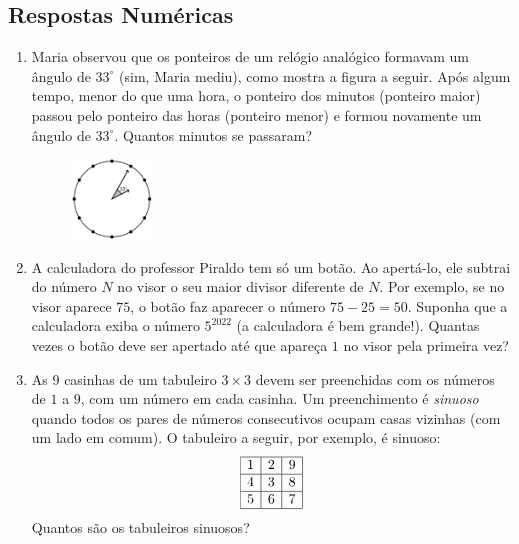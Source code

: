 \documentclass[12pt]{article}
\begin{document}
    \subsection{Respostas Numéricas}
    \begin{enumerate}[label=\textbf{\arabic*.}]
              \item Maria observou que os ponteiros de um relógio analógico formavam um ângulo de $33^\circ$ (sim, Maria mediu), como mostra a figura
        a seguir. Após algum tempo, menor do que uma hora, o ponteiro dos minutos (ponteiro maior) passou pelo ponteiro das horas (ponteiro
        menor) e formou novamente um ângulo de $33^\circ$. Quantos minutos se passaram? \\
        \begin{figure}[h]
          \centering
          \includegraphics[width=0.2\textwidth]{fourth.png}
        \end{figure}

      \item A calculadora do professor Piraldo tem só um botão. Ao apertá-lo, ele subtrai do número $N$ no visor o seu maior divisor diferente
        de $N$. Por exemplo, se no visor aparece $75$, o botão faz aparecer o número $75-25=50$. Suponha que a calculadora exiba o número
        $5^{2022}$ (a calculadora é bem grande!). Quantas vezes o botão deve ser apertado até que apareça $1$ no visor pela primeira vez?

      \item As 9 casinhas de um tabuleiro $3 \times 3$ devem ser preenchidas com os números de $1$ a $9$, com um número em cada casinha. Um preenchimento é \emph{sinuoso} quando todos os pares de números consecutivos ocupam casas vizinhas (com um lado em comum). O tabuleiro a seguir, por exemplo, é sinuoso:
        \[
          \begin{array}{|c|c|c|}\hline
            1 & 2 & 9 \\ \hline
            4 & 3 & 8 \\ \hline
            5 & 6 & 7 \\ \hline
          \end{array}
        \]
        Quantos são os tabuleiros sinuosos?


\end{enumerate}
\end{document}
